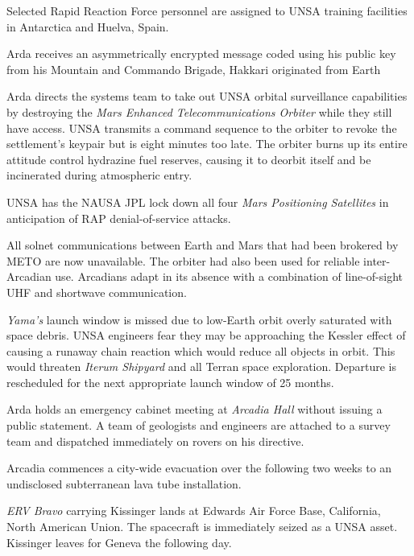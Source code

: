 Selected Rapid Reaction Force personnel are assigned to UNSA training facilities in Antarctica and Huelva, Spain.
\StopTimelineDate

Arda receives an asymmetrically encrypted message coded using his public key from his Mountain and Commando Brigade, Hakkari originated from Earth
\StopTimelineDate

Arda directs the systems team to take out UNSA orbital surveillance capabilities by destroying the {\it Mars Enhanced Telecommunications Orbiter} while they still have access. UNSA transmits a command sequence to the orbiter to revoke the settlement's keypair but is eight minutes too late. The orbiter burns up its entire attitude control hydrazine fuel reserves, causing it to deorbit itself and be incinerated during atmospheric entry. 

UNSA has the NAUSA JPL lock down all four {\it Mars Positioning Satellites} in anticipation of RAP denial-of-service attacks.

All solnet communications between Earth and Mars that had been brokered by METO are now unavailable. The orbiter had also been used for reliable inter-Arcadian use. Arcadians adapt in its absence with a combination of line-of-sight UHF and shortwave communication.
\StopTimelineDate

{\it Yama's} launch window is missed due to low-Earth orbit overly saturated with space debris. UNSA engineers fear they may be approaching the Kessler effect of causing a runaway chain reaction which would reduce all objects in orbit. This would threaten {\it Iterum Shipyard} and all Terran space exploration. Departure is rescheduled for the next appropriate launch window of 25 months.
\StopTimelineDate

Arda holds an emergency cabinet meeting at {\it Arcadia Hall} without issuing a public statement. A team of geologists and engineers are attached to a survey team and dispatched immediately on rovers on his directive.
\StopTimelineDate

Arcadia commences a city-wide evacuation over the following two weeks to an undisclosed subterranean lava tube installation.
\StopTimelineDate

{\it ERV Bravo} carrying Kissinger lands at Edwards Air Force Base, California, North American Union. The spacecraft is immediately seized as a UNSA asset. Kissinger leaves for Geneva the following day.
\StopTimelineDate

